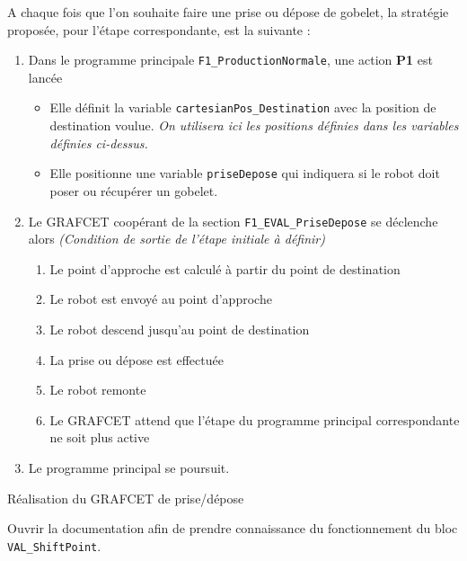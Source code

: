 A chaque fois que l'on souhaite faire une prise ou dépose de gobelet, la stratégie proposée, pour l'étape correspondante, est la suivante :
\begin{enumerate}
  \item Dans le programme principale \texttt{F1\_ProductionNormale}, une action \textbf{P1} est lancée
    \begin{itemize}
      \item Elle définit la variable \texttt{cartesianPos\_Destination} avec la position de destination voulue. \textit{On utilisera ici les positions définies dans les variables définies ci-dessus.}
      \item Elle positionne une variable \texttt{priseDepose} qui indiquera si le robot doit poser ou récupérer un gobelet.
    \end{itemize}
  \item Le GRAFCET coopérant de la section \texttt{F1\_EVAL\_PriseDepose} se déclenche alors \textit{(Condition de sortie de l'étape initiale à définir)}
    \begin{enumerate}
      \item Le point d'approche est calculé à partir du point de destination
      \item Le robot est envoyé au point d'approche
      \item Le robot descend jusqu'au point de destination
      \item La prise ou dépose est effectuée
      \item Le robot remonte
      \item Le GRAFCET attend que l'étape du programme principal correspondante ne soit plus active
    \end{enumerate}
  \item Le programme principal se poursuit.
\end{enumerate}

\begin{UPSTIManipulation}{Réalisation du GRAFCET de prise/dépose}


  Ouvrir la documentation afin de prendre connaissance du fonctionnement du bloc \texttt{VAL\_ShiftPoint}.
\end{UPSTIManipulation}